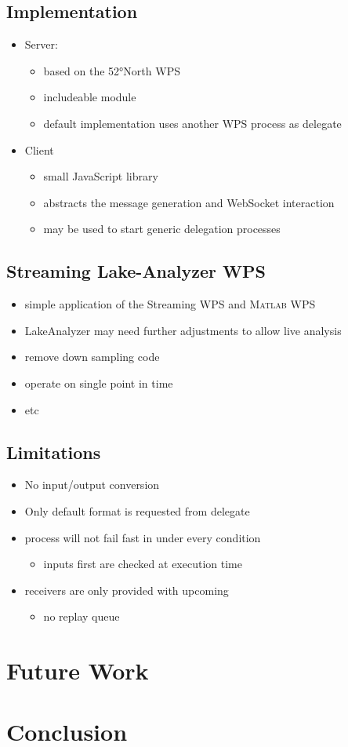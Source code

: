 	\section{Implementation}
	\begin{itemize}
		\item Server:
		\begin{itemize}
			\item based on the 52°North WPS
			\item includeable module
			\item default implementation uses another WPS process as delegate
		\end{itemize}
		\item Client
		\begin{itemize}
			\item small JavaScript library
			\item abstracts the message generation and WebSocket interaction
			\item may be used to start generic delegation processes
		\end{itemize}
	\end{itemize}
	\section{Streaming Lake-Analyzer WPS}
	\begin{itemize}
		\item simple application of the Streaming WPS and \textsc{Matlab} WPS
		\item LakeAnalyzer may need further adjustments to allow live analysis
		\item remove down sampling code
		\item operate on single point in time
		\item etc
	\end{itemize}
	\section{Limitations}
	\begin{itemize}
		\item No input/output conversion
		\item Only default format is requested from delegate
		\item process will not fail fast in under every condition
		\begin{itemize}
			\item inputs first are checked at execution time
		\end{itemize}
		\item receivers are only provided with upcoming
		\begin{itemize}
			\item no replay queue
		\end{itemize}
	\end{itemize}
\chapter{Future Work}
\chapter{Conclusion}